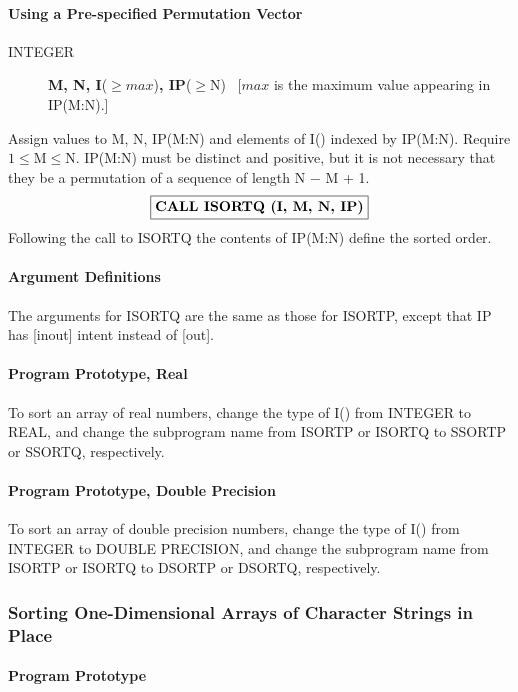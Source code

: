 \documentclass[twoside]{MATH77}
\begin{document}
\paragraph{Using a Pre-specified Permutation Vector}

\begin{description}
\item[INTEGER]  {\bf M, N, I}($\geq max$){\bf , IP}($\geq $N)
~{[$max$ is the maximum value appearing in IP(M:N).]}
\end{description}

Assign values to M, N, IP(M:N) and elements of I() indexed by IP(M:N).
Require $1 \leq \text{M} \leq \text{N}.$ IP(M:N) must be distinct and positive, but
it is not necessary that they be a permutation of a sequence of length N
$-$ M + 1.
$$
\fbox{{\bf CALL ISORTQ (I, M, N, IP)}}
$$
Following the call to ISORTQ the contents of IP(M:N) define the
sorted order.

\paragraph{Argument Definitions}

The arguments for ISORTQ are the same as those for ISORTP, except
that IP has [inout] intent instead of [out].

\paragraph{Program Prototype, Real}

To sort an array of real numbers, change the type of I() from INTEGER to
REAL, and change the subprogram name from ISORTP or ISORTQ to SSORTP or
SSORTQ, respectively.

\paragraph{Program Prototype, Double Precision}

To sort an array of double precision numbers, change the type of I() from
INTEGER to DOUBLE PRECISION, and change the subprogram name from ISORTP or
ISORTQ to DSORTP or DSORTQ, respectively.

\subsubsection{Sorting One-Dimensional Arrays of Character Strings in Place}

\paragraph{Program Prototype}
\end{document}
